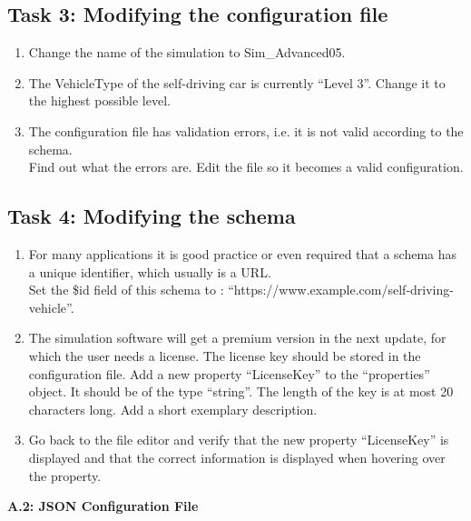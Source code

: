 \subsection{Task 3: Modifying the configuration file}
\begin{enumerate}
    \item Change the name of the simulation to Sim\_Advanced05.
    \item The VehicleType of the self-driving car is currently “Level 3”. Change it to the highest possible level.
    \item The configuration file has validation errors, i.e. it is not valid according to the schema.
    \\ Find out what the errors are. Edit the file so it becomes a valid configuration.

\end{enumerate}

\subsection{Task 4: Modifying the schema}
\begin{enumerate}
    \item For many applications it is good practice or even required that a schema has a unique identifier, which usually is a URL.
          \\Set the \$id field of this schema to : “https://www.example.com/self-driving-vehicle”.
    \item The simulation software will get a premium version in the next update, for which the user needs a license.
          The license key should be stored in the configuration file.
          Add a new property “LicenseKey” to the “properties” object.
          It should be of the type “string”.
          The length of the key is at most 20 characters long. Add a short exemplary description.
    \item Go back to the file editor and verify that the new property “LicenseKey” is displayed and that the correct information is displayed when hovering over the property.
\end{enumerate}

\newpage
{\large \textbf{A.2: JSON Configuration File  }} \\\\
